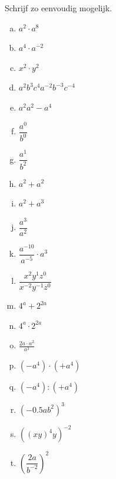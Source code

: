 \documentclass[12pt,twoside]{article}
\begin{document}
\begin{oefening}
Schrijf zo eenvoudig mogelijk.
\begin{multicols}{3}
\begin{enumerate}[(a)]
  \itemsep.5em
  \item $a^2\cdot a^8$
  \item $a^4\cdot a^{-2}$
  \item $x^2\cdot y^2$
  \item $a^2b^3c^4a^{-2}b^{-3}c^{-4}$
  \item $a^2a^2-a^4$
  \item $\dfrac{a^0}{b^0}$
  \item $\dfrac{a^1}{b^2}$
  \item $a^2+a^2$
  \item $a^2+a^3$
  \item $\dfrac{a^3}{a^2}$
  \item $\dfrac{a^{-10}}{a^{-5}}\cdot{a^3}$
  \item $\dfrac{x^2y^1z^0}{x^{-2}y^{-1}z^{0}}$
  \item $4^a+2^{2a}$
  \item $4^a\cdot2^{2a}$
  \item $\frac{2a\cdot a^{2}}{a^{3}}$
  \item $\left(-a^4\right)\cdot\left(+a^4\right)$
  \item $\left(-a^4\right):\left(+a^4\right)$
  \item $\left(-0.5ab^2\right)^3$
  \item $\left(\left(xy\right)^4y\right)^{-2}$
  \item $\left(\dfrac{2a}{b^{-2}}\right)^2$
\end{enumerate}
\end{multicols}
\end{oefening}
\end{document}
